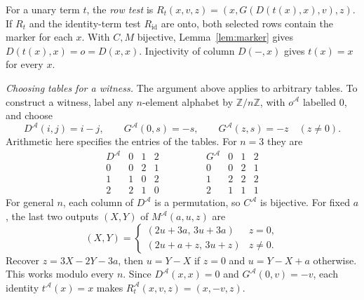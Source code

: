 \documentclass[a4paper,11pt]{article}
\newcommand{\id}{\mathrm{id}}
\newcommand{\Z}{\mathbb Z}
\newcommand{\A}{\mathcal A}
\begin{document}
For a unary term \(t\), the \emph{row test} is \(R_t(x,v,z)=(x,G(D(t(x),x),v),z)\). If \(R_t\) and the identity-term test \(R_{\id}\) are onto, both selected rows contain the marker for each \(x\). With \(C,M\) bijective, Lemma~\ref{lem:marker} gives \(D(t(x),x)=o=D(x,x)\). Injectivity of column \(D(-,x)\) gives \(t(x)=x\) for every \(x\).

\newpage
\noindent\emph{Choosing tables for a witness.} The argument above applies to arbitrary tables. To construct a witness, label any \(n\)-element alphabet by \(\Z/n\Z\), with \(o^\A\) labelled \(0\), and choose
\[
 D^{\A}(i,j)=i-j,\qquad G^{\A}(0,s)=-s,\qquad
 G^{\A}(z,s)=-z\quad (z\ne0).
\]
Arithmetic here specifies the entries of the tables. For \(n=3\) they are
\[
 \begin{array}{c|ccc}
 D^\A & 0&1&2\\ \hline
 0&0&2&1\\
 1&1&0&2\\
 2&2&1&0
 \end{array}
 \qquad\qquad
 \begin{array}{c|ccc}
 G^\A & 0&1&2\\ \hline
 0&0&2&1\\
 1&2&2&2\\
 2&1&1&1
 \end{array}
\]
For general \(n\), each column of \(D^{\A}\) is a permutation, so \(C^{\A}\) is bijective. For fixed \(a\), the last two outputs \((X,Y)\) of \(M^{\A}(a,u,z)\) are
\[
 (X,Y)=
 \begin{cases}
 (2u+3a,\,3u+3a) & z=0,\\
 (2u+a+z,\,3u+z) & z\ne0 .
 \end{cases}
\]
Recover \(z=3X-2Y-3a\), then \(u=Y-X\) if \(z=0\) and \(u=Y-X+a\) otherwise. This works modulo every \(n\). Since \(D^{\A}(x,x)=0\) and \(G^{\A}(0,v)=-v\), each identity \(t^{\A}(x)=x\) makes \(R_t^{\A}(x,v,z)=(x,-v,z)\).
\end{document}
